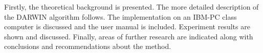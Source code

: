 Firstly, the theoretical background is presented. The more detailed
description of the DARWIN algorithm follows. The implementation on an IBM-PC
class computer is discussed and the user manual is included. Experiment
results are shown and discussed. Finally, areas of further research are
indicated along with conclusions and recommendations about the method.
